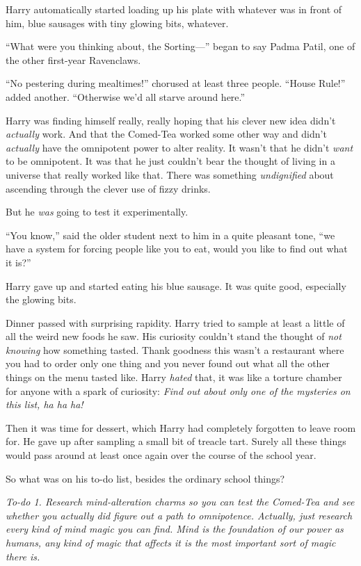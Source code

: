 Harry automatically started loading up his plate with whatever was in
front of him, blue sausages with tiny glowing bits, whatever.

``What were you thinking about, the Sorting---'' began to say Padma
Patil, one of the other first-year Ravenclaws.

``No pestering during mealtimes!'' chorused at least three people.
``House Rule!'' added another. ``Otherwise we'd all starve around
here.''

Harry was finding himself really, really hoping that his clever new idea
didn't \emph{actually} work. And that the Comed-Tea worked some other
way and didn't \emph{actually} have the omnipotent power to alter
reality. It wasn't that he didn't \emph{want} to be omnipotent. It was
that he just couldn't bear the thought of living in a universe that
really worked like that. There was something \emph{undignified} about
ascending through the clever use of fizzy drinks.

But he \emph{was} going to test it experimentally.

``You know,'' said the older student next to him in a quite pleasant
tone, ``we have a system for forcing people like you to eat, would you
like to find out what it is?''

Harry gave up and started eating his blue sausage. It was quite good,
especially the glowing bits.

Dinner passed with surprising rapidity. Harry tried to sample at least a
little of all the weird new foods he saw. His curiosity couldn't stand
the thought of \emph{not knowing} how something tasted. Thank goodness
this wasn't a restaurant where you had to order only one thing and you
never found out what all the other things on the menu tasted like. Harry
\emph{hated} that, it was like a torture chamber for anyone with a spark
of curiosity: \emph{Find out about only one of the mysteries on this
list, ha ha ha!}

Then it was time for dessert, which Harry had completely forgotten to
leave room for. He gave up after sampling a small bit of treacle tart.
Surely all these things would pass around at least once again over the
course of the school year.

So what was on his to-do list, besides the ordinary school things?

\emph{To-do 1. Research mind-alteration charms so you can test the
Comed-Tea and see whether you actually did figure out a path to
omnipotence. Actually, just research every kind of mind magic you can
find. Mind is the foundation of our power as humans, any kind of magic
that affects it is the most important sort of magic there is.}

